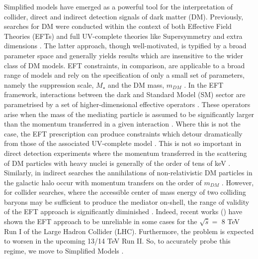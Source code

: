 \begin{flushleft}
Simplified models have emerged as a powerful tool for the interpretation of collider, direct and indirect detection signals of dark matter (DM). Previously,  searches for DM were conducted within the context of both Effective Field Theories (EFTs) \cite{Aad:1363019, ATLAS-CONF-2012-147, CMS-PAS-EXO-12-048, Buckley:2013jwa, Abdallah:1472683, MonoZ, MonoX} and full UV-complete theories like Supersymmetry \cite{ComppMSSM, Aad:2012ms, Aad:2012fqa, Aad:2014wea, SUSY_official_paper} and extra dimensions \cite{}. The latter approach, though well-motivated, is typified by a broad parameter space and generally yields results which are insensitive to the wider class of DM models. EFT constraints, in comparison, are applicable to a broad range of models and rely on the specification of only a small set of parameters, namely the suppression scale, $M_{\star}$ and the DM mass, $m_{DM}$ \cite{}. 
In the EFT framework, interactions between the dark and Standard Model (SM) sector are parametrised by a set of higher-dimensional effective operators \cite{}. These operators arise when the mass of the mediating particle is assumed to be significantly larger than the momentum transferred in a given interaction \cite{}. Where this is not the case, the EFT prescription can produce constraints which detour dramatically from those of the associated UV-complete model \cite{Bai:2010hh, DMCons2, Fox:2011fx, Graesser:2011vj, An:2011ck}. This is not so important in direct detection experiments where the momentum transferred in the scattering of DM particles with heavy nuclei is generally of the order of tens of keV \cite{EFTDM, DMCons3}. Similarly, in indirect searches the annihilations of non-relativistic DM particles in the galactic halo occur with momentum transfers on the order of $m_{DM}$ \cite{}. However, for collider searches, where the accessible center of mass energy of two colliding baryons may be sufficient to produce the mediator on-shell, the range of validity of the EFT approach is significantly diminished \cite{}. Indeed, recent works (\cite{}) have shown the EFT approach to be unreliable in some cases for the $\sqrt{\hat{s}} =$ 8 TeV Run I of the Large Hadron Collider (LHC). Furthermore, the problem is expected to worsen in the upcoming 13/14 TeV Run II. So, to accurately probe this regime, we move to Simplified Models \cite{Buchmueller:2014yoa}.
\bigskip


\end{flushleft}
